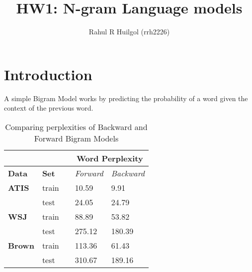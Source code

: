 \documentclass{article}
\begin{document}
\title{HW1: N-gram Language models}
\author{Rahul R Huilgol (rrh2226)}
\maketitle

\section{Introduction}
A simple Bigram Model works by predicting the probability of a word given the context of the previous word. 
\begin{table}[h]
\centering
\begin{tabular}{@{}lllll@{}}
\toprule
\textbf{}      & \textbf{}    &  & \multicolumn{2}{c}{\textbf{Word Perplexity}} \\ \midrule
\textbf{Data}  & \textbf{Set} &  & \textit{Forward}     & \textit{Backward}     \\ \midrule
\textbf{ATIS}  & train        &  & 10.59               & 9.91               \\ \midrule
               & test         &  & 24.05               & 24.79                \\ \midrule
\textbf{WSJ}   & train        &  & 88.89               & 53.82                \\ \midrule
               & test         &  & 275.12               & 180.39               \\ \midrule
\textbf{Brown} & train        &  & 113.36              & 61.43                \\ \midrule
               & test         &  & 310.67              & 189.16               \\ \bottomrule
\end{tabular}
\caption{Comparing perplexities of Backward and Forward Bigram Models}
\label{backvforw}
\end{table}
\end{document}
